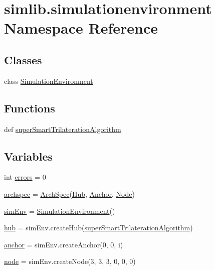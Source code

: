 \hypertarget{namespacesimlib_1_1simulationenvironment}{}\section{simlib.\+simulationenvironment Namespace Reference}
\label{namespacesimlib_1_1simulationenvironment}
\subsection*{Classes}
\begin{DoxyCompactItemize}
\item 
class \mbox{\hyperlink{classsimlib_1_1simulationenvironment_1_1_simulation_environment}{Simulation\+Environment}}
\end{DoxyCompactItemize}
\subsection*{Functions}
\begin{DoxyCompactItemize}
\item 
def \mbox{\hyperlink{namespacesimlib_1_1simulationenvironment_a8566de74a9664d786456c8f421bae003}{super\+Smart\+Trilateration\+Algorithm}}
\end{DoxyCompactItemize}
\subsection*{Variables}
\begin{DoxyCompactItemize}
\item 
int \mbox{\hyperlink{namespacesimlib_1_1simulationenvironment_afca3d89fb0a9c3b8441731937fdb718b}{errors}} = 0
\item 
\mbox{\hyperlink{namespacesimlib_1_1simulationenvironment_ac51ae42eb734cfcbf3d6fcf3d219c485}{archspec}} = \mbox{\hyperlink{classsimlib_1_1archspec_1_1_arch_spec}{Arch\+Spec}}(\mbox{\hyperlink{classsimlib_1_1hub_1_1_hub}{Hub}}, \mbox{\hyperlink{classsimlib_1_1anchor_1_1_anchor}{Anchor}}, \mbox{\hyperlink{classsimlib_1_1node_1_1_node}{Node}})
\item 
\mbox{\hyperlink{namespacesimlib_1_1simulationenvironment_ae355a1a48b935c4b881094d757cc7375}{sim\+Env}} = \mbox{\hyperlink{classsimlib_1_1simulationenvironment_1_1_simulation_environment}{Simulation\+Environment}}()
\item 
\mbox{\hyperlink{namespacesimlib_1_1simulationenvironment_af2a82533143b12ae401b918e0ae2df42}{hub}} = sim\+Env.\+create\+Hub(\mbox{\hyperlink{namespacesimlib_1_1simulationenvironment_a8566de74a9664d786456c8f421bae003}{super\+Smart\+Trilateration\+Algorithm}})
\item 
\mbox{\hyperlink{namespacesimlib_1_1simulationenvironment_aad5780d29dfac02d8af8fe401c6e6a3b}{anchor}} = sim\+Env.\+create\+Anchor(0, 0, i)
\item 
\mbox{\hyperlink{namespacesimlib_1_1simulationenvironment_a49e74569249d8a4b630c5aeabe9219b3}{node}} = sim\+Env.\+create\+Node(3, 3, 3, 0, 0, 0)
\end{DoxyCompactItemize}


